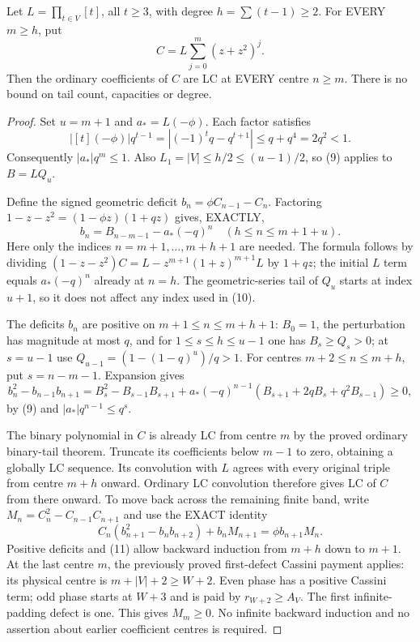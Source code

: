 \begin{theorem}
Let $L=\prod_{t\in V}[t]$, all $t\ge3$, with degree
$h=\sum(t-1)\ge2$. For EVERY $m\ge h$, put
\[
 C=L\sum_{j=0}^m(z+z^2)^j.
\]
Then the ordinary coefficients of $C$ are LC at EVERY centre
$n\ge m$. There is no bound on tail count, capacities or degree.
\end{theorem}
\begin{proof}
Set $u=m+1$ and $a_*=L(-\phi)$. Each factor satisfies
\[
 |[t](-\phi)|q^{t-1}
       =|(-1)^tq-q^{t+1}|\le q+q^4=2q^2<1.
\]
Consequently $|a_*|q^m\le1$. Also $L_1=|V|\le h/2\le(u-1)/2$,
so (9) applies to $B=LQ_u$.

Define the signed geometric deficit $b_n=\phi C_{n-1}-C_n$.
Factoring $1-z-z^2=(1-\phi z)(1+qz)$ gives, EXACTLY,
\[
 b_n=B_{n-m-1}-a_*(-q)^n
           \quad(h\le n\le m+1+u).                 \tag{10}
\]
Here only the indices $n=m+1,\ldots,m+h+1$ are needed.
The formula follows by dividing
$(1-z-z^2)C=L-z^{m+1}(1+z)^{m+1}L$ by $1+qz$;
the initial $L$ term equals $a_*(-q)^n$ already at $n=h$.
The geometric-series tail of $Q_u$ starts at index $u+1$,
so it does not affect any index used in (10).

The deficits $b_n$ are positive on $m+1\le n\le m+h+1$:
$B_0=1$, the perturbation has magnitude at most $q$, and for
$1\le s\le h\le u-1$ one has $B_s\ge Q_s>0$;
at $s=u-1$ use $Q_{u-1}=(1-(1-q)^u)/q>1$.
For centres $m+2\le n\le m+h$, put $s=n-m-1$.
Expansion gives
\[
 b_n^2-b_{n-1}b_{n+1}
 =B_s^2-B_{s-1}B_{s+1}
   +a_*(-q)^{n-1}(B_{s+1}+2qB_s+q^2B_{s-1})\ge0,   \tag{11}
\]
by (9) and $|a_*|q^{n-1}\le q^s$.

The binary polynomial in $C$ is already LC from centre $m$
by the proved ordinary binary-tail theorem. Truncate its coefficients
below $m-1$ to zero, obtaining a globally LC sequence. Its convolution
with $L$ agrees with every original triple from centre $m+h$ onward.
Ordinary LC convolution therefore gives LC of $C$ from there onward.
To move back across the remaining finite band, write
$M_n=C_n^2-C_{n-1}C_{n+1}$ and use the EXACT identity
\[
 C_n(b_{n+1}^2-b_nb_{n+2})+b_nM_{n+1}
                           =\phi b_{n+1}M_n.        \tag{12}
\]
Positive deficits and (11) allow backward induction from $m+h$
down to $m+1$. At the last centre $m$, the previously proved
first-defect Cassini payment applies: its physical centre is
$m+|V|+2\ge W+2$. Even phase has a positive Cassini term;
odd phase starts at $W+3$ and is paid by $r_{W+2}\ge A_V$.
The first infinite-padding defect is one. This gives $M_m\ge0$.
No infinite backward induction and no assertion about earlier
coefficient centres is required.
\end{proof}

